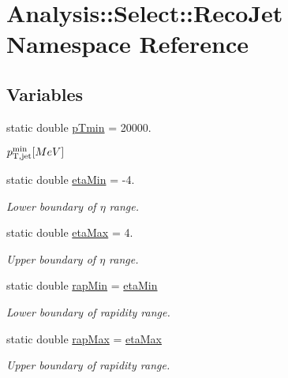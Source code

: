 \hypertarget{namespaceAnalysis_1_1Select_1_1RecoJet}{}\section{Analysis\+:\+:Select\+:\+:Reco\+Jet Namespace Reference}
\label{namespaceAnalysis_1_1Select_1_1RecoJet}
\subsection*{Variables}
\begin{DoxyCompactItemize}
\item 
static double \hyperlink{namespaceAnalysis_1_1Select_1_1RecoJet_af7dbdbda43aa5be9d83a31fc3b41ac14}{p\+Tmin} = 20000.
\begin{DoxyCompactList}\small\item\em $ p_{\rm T,jet}^{\rm min} [MeV] $ \end{DoxyCompactList}\item 
static double \hyperlink{namespaceAnalysis_1_1Select_1_1RecoJet_ac41d804583ac29fe7c1f64a692b8a747}{eta\+Min} = -\/4.
\begin{DoxyCompactList}\small\item\em Lower boundary of $ \eta $ range. \end{DoxyCompactList}\item 
static double \hyperlink{namespaceAnalysis_1_1Select_1_1RecoJet_ae6e8687dcd257798bc0849d786c4a7e0}{eta\+Max} = 4.
\begin{DoxyCompactList}\small\item\em Upper boundary of $ \eta $ range. \end{DoxyCompactList}\item 
static double \hyperlink{namespaceAnalysis_1_1Select_1_1RecoJet_a5e056f65c8f2f9b0ad358760fc0f4481}{rap\+Min} = \hyperlink{namespaceAnalysis_1_1Select_1_1RecoJet_ac41d804583ac29fe7c1f64a692b8a747}{eta\+Min}
\begin{DoxyCompactList}\small\item\em Lower boundary of rapidity range. \end{DoxyCompactList}\item 
static double \hyperlink{namespaceAnalysis_1_1Select_1_1RecoJet_ada7395a2f03291db87208b68e4030d92}{rap\+Max} = \hyperlink{namespaceAnalysis_1_1Select_1_1RecoJet_ae6e8687dcd257798bc0849d786c4a7e0}{eta\+Max}
\begin{DoxyCompactList}\small\item\em Upper boundary of rapidity range. \end{DoxyCompactList}\item 

\end{DoxyCompactItemize}
